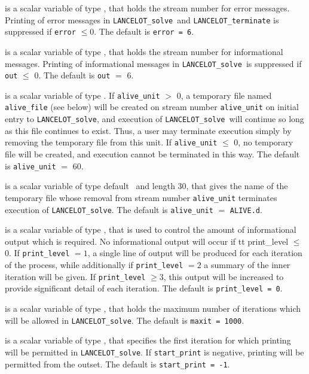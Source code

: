 \documentclass{galahad}
\newcommand{\fullpackagename}{LANC\-E\-LOT}
\newcommand{\solver}{{\tt \fullpackagename\_solve}}
\begin{document}
\begin{description}

 is a scalar variable of type \integer, that holds the
stream number for error messages. Printing of error messages in
\solver\ and {\tt \fullpackagename\_terminate} is suppressed if
{\tt error} $\leq 0$.
The default is {\tt error = 6}.

 is a scalar variable of type \integer, that holds the
stream number for informational messages.
Printing of informational messages in
\solver\
is suppressed if {\tt out} $\leq$ 0.
The default is {\tt out} $=$ 6.

 is a scalar variable of type \integer.
If {\tt alive\_unit} $>$ 0, a temporary file named {\tt alive\_file} (see below)
will be created on stream number {\tt alive\_unit} on initial entry to
\solver, and execution of \solver\ will continue so
long as this file continues to exist. Thus, a user may terminate execution
simply by removing the temporary file from this unit.
If {\tt alive\_unit} $\leq$ 0, no temporary file will be created, and
execution cannot be terminated in this way.
The default is {\tt alive\_unit} $=$ 60.

 is a scalar variable of type default \character\ and length
30, that gives the name of the temporary file whose removal from stream number
{\tt alive\_unit} terminates execution of \solver.
The default is {\tt alive\_unit} $=$ {\tt ALIVE.d}.

 is a scalar variable of type \integer, that is used
to control the amount of informational output which is required. No
informational output will occur if {tt print\_level} $\leq$ 0. If
{\tt print\_level} $= 1$, a single line of output will be produced for each
iteration of the process, while additionally if {\tt print\_level} $= 2$
a summary of the inner iteration will be given.
If {\tt print\_level} $\geq 3$, this output will be
increased to provide significant detail of each iteration.
The default is {\tt print\_level = 0}.

 is a scalar variable of type \integer, that holds the
maximum number of iterations which will be allowed in \solver.
The default is {\tt maxit = 1000}.

 is a scalar variable of type \integer, that specifies
the first iteration for which printing will be permitted in \solver.
If {\tt start\_print} is negative, printing will be permitted from the outset.
The default is {\tt start\_print = -1}.


\end{description}
\end{document}
